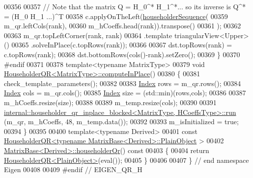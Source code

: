 \begin{DoxyCode}
00356 
00357   \textcolor{comment}{// Note that the matrix Q = H\_0^* H\_1^*... so its inverse is Q^* = (H\_0 H\_1 ...)^T}
00358   c.applyOnTheLeft(\hyperlink{group___householder___module_ga4bd4b85120e014cf1125a054b02d4d92}{householderSequence}(
00359     m\_qr.leftCols(rank),
00360     m\_hCoeffs.head(rank)).transpose()
00361   );
00362 
00363   m\_qr.topLeftCorner(rank, rank)
00364       .template triangularView<Upper>()
00365       .solveInPlace(c.topRows(rank));
00366 
00367   dst.topRows(rank) = c.topRows(rank);
00368   dst.bottomRows(cols()-rank).setZero();
00369 \}
00370 \textcolor{preprocessor}{#endif}
00371 
00378 \textcolor{keyword}{template}<\textcolor{keyword}{typename} MatrixType>
00379 \textcolor{keywordtype}{void} \hyperlink{group___q_r___module_a3a16530338a734971fc45efb0ef9ac94}{HouseholderQR<MatrixType>::computeInPlace}()
00380 \{
00381   check\_template\_parameters();
00382   
00383   \hyperlink{namespace_eigen_a62e77e0933482dafde8fe197d9a2cfde}{Index} rows = m\_qr.rows();
00384   \hyperlink{namespace_eigen_a62e77e0933482dafde8fe197d9a2cfde}{Index} cols = m\_qr.cols();
00385   \hyperlink{namespace_eigen_a62e77e0933482dafde8fe197d9a2cfde}{Index} size = (std::min)(rows,cols);
00386 
00387   m\_hCoeffs.resize(size);
00388 
00389   m\_temp.resize(cols);
00390 
00391   \hyperlink{struct_eigen_1_1internal_1_1householder__qr__inplace__blocked}{internal::householder\_qr\_inplace\_blocked<MatrixType, HCoeffsType>::run}
      (m\_qr, m\_hCoeffs, 48, m\_temp.data());
00392 
00393   m\_isInitialized = \textcolor{keyword}{true};
00394 \}
00395 
00400 \textcolor{keyword}{template}<\textcolor{keyword}{typename} Derived>
00401 \textcolor{keyword}{const} \hyperlink{group___q_r___module_class_eigen_1_1_householder_q_r}{HouseholderQR<typename MatrixBase<Derived>::PlainObject}
      >
00402 \hyperlink{group___core___module_a9a9377aab1cea26db5f25bab7e682f8f}{MatrixBase<Derived>::householderQr}()\textcolor{keyword}{ const}
00403 \textcolor{keyword}{}\{
00404   \textcolor{keywordflow}{return} \hyperlink{group___q_r___module_class_eigen_1_1_householder_q_r}{HouseholderQR<PlainObject>}(eval());
00405 \}
00406 
00407 \} \textcolor{comment}{// end namespace Eigen}
00408 
00409 \textcolor{preprocessor}{#endif // EIGEN\_QR\_H}
\end{DoxyCode}

